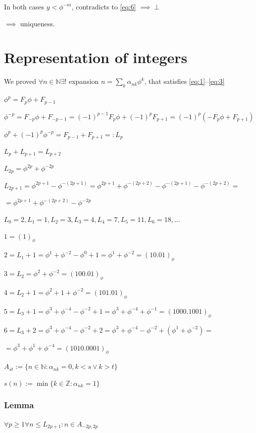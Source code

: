 \documentclass{article}
\begin{document}
In both cases $y < \phi^{-m}$, contradicts to \eqref{eq:6} $\implies \perp$

$\implies$ uniqueness.

\section*{Representation of integers}

We proved $\forall n \in \mathbb{N} \exists!$ expansion $n = \sum_{k} \alpha_{nk} \phi^k$, that satisfies \eqref{eq:1}--\eqref{eq:3}

$\phi^p = F_p \phi + F_{p-1}$

$\phi^{-p} = F_{-p} \phi + F_{-p-1} = (-1)^{p-1}F_p \phi + (-1)^pF_{p+1} = (-1)^p(-F_p\phi + F_{p+1})$

$\phi^p + (-1)^p\phi^{-p} = F_{p-1} + F_{p+1} =: L_p$

$L_p + L_{p+1} = L_{p+2}$

$L_{2p} = \phi^{2p} + \phi^{-2p}$

$L_{2p+1} = \phi^{2p+1} - \phi^{-(2p+1)} = \phi^{2p+1} + \phi^{-(2p+2)} - \phi^{-(2p+1)} - \phi^{-(2p+2)} =$

$= \phi^{2p+1} + \phi^{-(2p+2)} - \phi^{-2p}$

$L_0 = 2, L_1 = 1, L_2 = 3, L_3 = 4, L_4 = 7, L_5 = 11, L_6 = 18, \ldots$

$1 = (1)_\phi$

$2 = L_1 + 1 = \phi^1 + \phi^{-2} - \phi^0 + 1 = \phi^1 + \phi^{-2} = (10.01)_\phi$

$3 = L_2 = \phi^2 + \phi^{-2} = (100.01)_\phi$

$4 = L_2 + 1= \phi^2 + 1 + \phi^{-2} = (101.01)_\phi$

$5 = L_3 + 1 = \phi^3 + \phi^{-4} - \phi^{-2} + 1 = \phi^3 + \phi^{-4} + \phi^{-1} = (1000.1001)_\phi$

$6 = L_3 + 2 = \phi^3 + \phi^{-4} - \phi^{-2} + 2 = \phi^3 + \phi^{-4} - \phi^{-2} + (\phi^1 + \phi^{-2}) =$

$= \phi^3 + \phi^1 + \phi^{-4} = (1010.0001)_\phi$

$A_{st} := \{ n \in \mathbb{N}: \alpha_{nk} = 0, k < s \lor k > t \}$

$s(n) := \min \{ k \in \mathbb{Z} : \alpha_{nk} = 1 \}$

\subsubsection*{Lemma}

$\forall p \geq 1 \forall n \leq L_{2p+1}: n \in A_{-2p,2p}$
\end{document}
